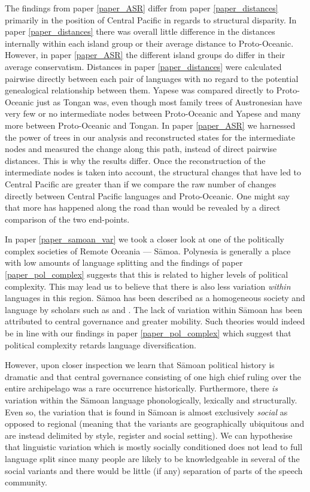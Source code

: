 \documentclass[a4paper,10pt]{article} %
\begin{document}
The findings from paper \ref{paper_ASR} differ from paper \ref{paper_distances} primarily in the position of Central Pacific in regards to structural disparity. In paper \ref{paper_distances} there was overall little difference in the distances internally within each island group or their average distance to Proto-Oceanic. However, in paper \ref{paper_ASR} the different island groups do differ in their average conservatism. Distances in paper \ref{paper_distances} were calculated pairwise directly between each pair of languages with no regard to the potential genealogical relationship between them. Yapese was compared directly to Proto-Oceanic just as Tongan was, even though most family trees of Austronesian have very few or no intermediate nodes between Proto-Oceanic and Yapese and many more between Proto-Oceanic and Tongan. In paper \ref{paper_ASR} we harnessed the power of trees in our analysis and reconstructed states for the intermediate nodes and measured the change along this path, instead of direct pairwise distances. This is why the results differ. Once the reconstruction of the intermediate nodes is taken into account, the structural changes that have led to Central Pacific are greater than if we compare the raw number of changes directly between Central Pacific languages and Proto-Oceanic. One might say that more has happened along the road than would be revealed by a direct comparison of the two end-points.

In paper \ref{paper_samoan_var} we took a closer look at one of the politically complex societies of Remote Oceania --- S\={a}moa. Polynesia is generally a place with low amounts of language splitting and the findings of paper \ref{paper_pol_complex} suggests that this is related to higher levels of political complexity. This may lead us to believe that there is also less variation \emph{within} languages in this region. S\={a}moa has been described as a homogeneous society and language by scholars such as \citet{mead1937samoans} and \citet{turner1884}. The lack of variation within S\={a}moan has been attributed to central governance and greater mobility. Such theories would indeed be in line with our findings in paper \ref{paper_pol_complex} which suggest that political complexity retards language diversification.

However, upon closer inspection we learn that S\={a}moan political history is dramatic and that central governance consisting of one high chief ruling over the entire archipelago was a rare occurrence historically. Furthermore, there \emph{is} variation within the S\={a}moan language phonologically, lexically and structurally. Even so, the variation that is found in S\={a}moan is almost exclusively \emph{social} as opposed to regional (meaning that the variants are  geographically ubiquitous and are instead delimited by style, register and social setting). We can hypothesise that linguistic variation which is mostly socially conditioned does not lead to full language split since many people are likely to be knowledgeable in several of the social variants and there would be little (if any) separation of parts of the speech community. 
\end{document}
